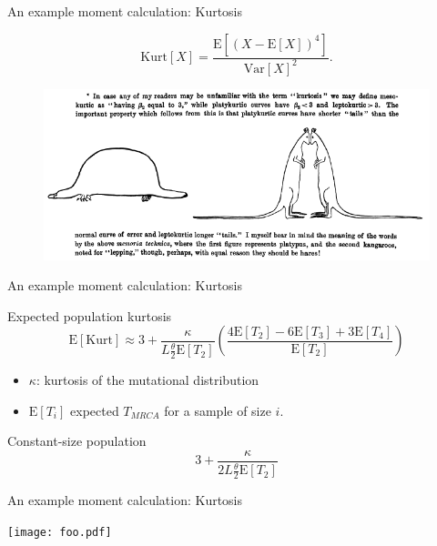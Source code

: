 \documentclass{beamer}
\newcommand{\T}{\frac{\theta}{2}}
\newcommand{\E}{\mathrm{E}}
\newcommand{\Var}{\mathrm{Var}}
\begin{document}
\begin{frame}{An example moment calculation: Kurtosis}
  \begin{definition}[Kurtosis]
    \begin{equation*}
      \mbox{Kurt}[X]=\frac{\E[(X-\E[X])^4]}{\Var[X]^2}.
    \end{equation*}
  \end{definition}
  \begin{figure}
    \includegraphics[width=\textwidth]{kurtosis-Student1927.png}        
  \end{figure}
\end{frame}

\begin{frame}{An example moment calculation: Kurtosis}
  \begin{block}{Expected population kurtosis}
    \begin{equation*}
      \E[\mbox{Kurt}] \approx 3 + \frac{\kappa}{L \T \E[T_2]}\left( \frac{4\E[T_2] - 6\E[T_3] +
        3\E[T_4]}{\E[T_2]}\right)
    \end{equation*}
  \end{block}
  \begin{itemize}
  \item $\kappa$: kurtosis of the mutational distribution
  \item $\E[T_i]$ expected $T_{MRCA}$ for a sample of size $i$. 
  \end{itemize}
  \begin{block}{Constant-size population}
    \begin{equation*}
      3 + \frac{\kappa}{2L\T \E[T_2]}
    \end{equation*}
  \end{block}
\end{frame}

\begin{frame}{An example moment calculation: Kurtosis}
  \begin{center}
    \texttt{[image: foo.pdf]}
  \end{center}
\end{frame}
\end{document}
